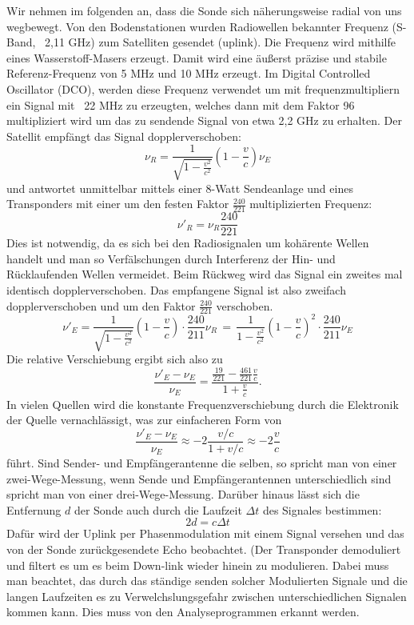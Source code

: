 Wir nehmen im folgenden an, dass die Sonde sich näherungsweise radial von uns wegbewegt.
Von den Bodenstationen wurden Radiowellen bekannter Frequenz (S-Band, ~2,11 GHz) zum Satelliten gesendet (uplink).
Die Frequenz wird mithilfe eines Wasserstoff-Masers erzeugt.
Damit wird eine äußerst präzise und stabile Referenz-Frequenz von 5 MHz und 10 MHz erzeugt. Im Digital Controlled Oscillator (DCO), werden diese Frequenz verwendet um mit frequenzmultipliern ein Signal mit ~22 MHz zu erzeugten, welches dann mit dem Faktor 96 multipliziert wird um das zu sendende Signal von etwa 2,2 GHz zu erhalten.\cite{Anderson2002}
Der Satellit empfängt das Signal dopplerverschoben:
\begin{equation}
 \nu_R = \frac{1}{\sqrt{1-\frac{v^2}{c^2}}}(1-\frac{v}{c})\nu_E
\end{equation}
und antwortet unmittelbar mittels einer 8-Watt Sendeanlage und eines Transponders
mit einer um den festen Faktor $ \frac{240}{221} $ multiplizierten Frequenz:
\begin{equation}
\nu'_R = \nu_R\frac{240}{221}
\end{equation}
Dies ist notwendig, da es sich bei den Radiosignalen um kohärente Wellen handelt und man so Verfälschungen durch Interferenz der Hin- und Rücklaufenden Wellen vermeidet.\cite{Anderson2002}
Beim Rückweg wird das Signal ein zweites mal identisch dopplerverschoben.
Das empfangene Signal ist also zweifach dopplerverschoben und um den Faktor $\frac{240}{221}$ verschoben.
\begin{equation}
 \nu'_E = \frac{1}{\sqrt{1-\frac{v^2}{c^2}}}(1-\frac{v}{c}) \cdot \frac{240}{211}\nu_R \, = \,
\frac{1}{1-\frac{v^2}{c^2}}(1-\frac{v}{c})^2 \cdot \frac{240}{211} \nu_E
\end{equation}
Die relative Verschiebung ergibt sich also zu
\begin{equation}
 \frac{\nu'_E-\nu_E}{\nu_E} = \frac{\frac{19}{221}- \frac{461}{221}\frac{v}{c}}{1+\frac{v}{c}}.
\end{equation}
In vielen Quellen wird die konstante Frequenzverschiebung durch die Elektronik der Quelle vernachlässigt, was zur
einfacheren Form von
\begin{equation}
 \frac{\nu'_E-\nu_E}{\nu_E} \approx -2\frac{v/c}{1+v/c} \approx -2 \frac{v}{c}
\end{equation}
führt.
Sind Sender- und Empfängerantenne die selben, so spricht man von einer zwei-Wege-Messung, wenn Sende und Empfängerantennen unterschiedlich sind spricht man von einer drei-Wege-Messung.\cite{Levy2009} %
Darüber hinaus lässt sich die Entfernung $d$ der Sonde auch durch die Laufzeit $\Delta t$ des Signales bestimmen:
\begin{equation}
 2d = c \Delta t
\end{equation}
Dafür wird der Uplink per Phasenmodulation mit einem Signal versehen und das von der Sonde zurückgesendete Echo beobachtet. (Der Transponder demoduliert und filtert es um es beim Down-link wieder hinein zu modulieren.
Dabei muss man beachtet, das durch das ständige senden solcher Modulierten Signale und die langen Laufzeiten es zu Verwelchslungsgefahr zwischen unterschiedlichen Signalen kommen kann. Dies muss von den Analyseprogrammen erkannt werden.

